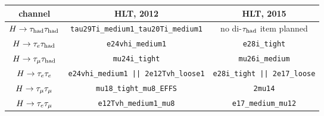 \begin{tabular}{c|c|c}
  channel      & HLT, 2012                   & HLT, 2015 \\
  \hline\hline
  $H\rightarrow\tau_\text{had}\tau_\text{had}$ & \texttt{tau29Ti\_medium1\_tau20Ti\_medium1} & no di-$\tau_\text{had}$ item planned \\
  \hline
  $H\rightarrow\tau_e \tau_\text{had}$ & \texttt{e24vhi\_medium1}                    & \texttt{e28i\_tight}                 \\
  $H\rightarrow\tau_\mu \tau_\text{had}$ & \texttt{mu24i\_tight}                       & \texttt{mu26i\_medium}               \\
  \hline
  $H\rightarrow\tau_e \tau_e$ & \texttt{e24vhi\_medium1 || 2e12Tvh\_loose1} & \texttt{e28i\_tight || 2e17\_loose}  \\
  $H\rightarrow\tau_\mu \tau_\mu$ & \texttt{mu18\_tight\_mu8\_EFFS}             & \texttt{2mu14}                       \\
  $H\rightarrow\tau_e \tau_\mu$ & \texttt{e12Tvh\_medium1\_mu8}               & \texttt{e17\_medium\_mu12}           \\
  \hline\hline
\end{tabular}

